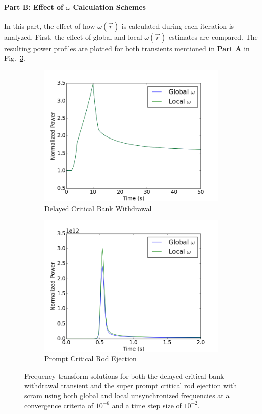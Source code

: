 \documentclass[12pt]{report}
\begin{document}
	\paragraph{Part B: Effect of $\omega$ Calculation Schemes}
	In this part, the effect of how $\omega(\vec{r})$ is calculated during each iteration is analyzed. First, the effect of global and local $\omega(\vec{r})$ estimates are compared. The resulting power profiles are plotted for both transients mentioned in \textbf{Part A} in Fig.~\ref{fig::global_local}.
	\begin{figure}[ht]
		\centering
		\begin{subfigure}{.49\textwidth}
			\centering
			\includegraphics[width=.95\linewidth]{figs/global_local_case1.png}
			\caption{Delayed Critical Bank Withdrawal}
			\label{fig::global_local_case1}
		\end{subfigure}
		\begin{subfigure}{.49\textwidth}
			\centering
			\includegraphics[width=.95\linewidth]{figs/global_local_case2.png}
			\caption{Prompt Critical Rod Ejection}
			\label{fig::global_local_case2}
		\end{subfigure}
		\caption{Frequency transform solutions for both the delayed critical bank withdrawal transient and the super prompt critical rod ejection with scram using both global and local unsynchronized frequencies at a convergence criteria  of $10^{-6}$ and a time step size of $10^{-2}$.}
		\label{fig::global_local}
	\end{figure}
	
\end{document}
